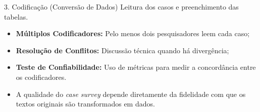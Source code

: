 \begin{frame}{3. Codificação (Conversão de Dados)}
    \justifying
    Leitura dos casos e preenchimento das tabelas.

    \vspace{0.5em}
    \begin{itemize}
        \item \textbf{Múltiplos Codificadores:} Pelo menos dois pesquisadores leem cada caso;
        \item \textbf{Resolução de Conflitos:} Discussão técnica quando há divergência;
        \item \textbf{Teste de Confiabilidade:} Uso de métricas para medir a concordância entre os codificadores.
        \item A qualidade do \textit{case survey} depende diretamente da fidelidade com que os textos originais são transformados em dados.
    \end{itemize}

\end{frame}
